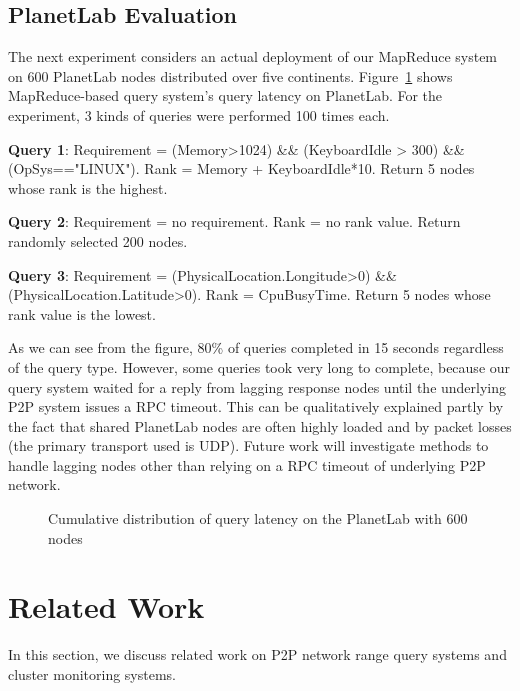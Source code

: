 \documentclass{acm_proc_article-sp}
\begin{document}
\subsection{PlanetLab Evaluation}
The next experiment considers an actual deployment of our MapReduce system on 600 PlanetLab nodes distributed over five continents. Figure~\ref{fig:plab} shows MapReduce-based query system's query latency on PlanetLab. 
For the experiment, 3 kinds of queries were performed 100 times each. 

\textbf{Query 1}: Requirement = (Memory>1024) \&\& (KeyboardIdle > 300) \&\& (OpSys=="LINUX"). Rank = Memory + KeyboardIdle*10. Return 5 nodes whose rank is the highest.

\textbf{Query 2}: Requirement = no requirement. Rank = no rank value. Return randomly selected 200 nodes. 

\textbf{Query 3}: Requirement = (PhysicalLocation.Longitude>0) \&\& (PhysicalLocation.Latitude>0). Rank = CpuBusyTime. Return 5 nodes whose rank value is the lowest.

As we can see from the figure, 80\% of queries completed in 15 seconds regardless of the query type. However, some queries took very long to complete, 
because our query system waited for a reply from lagging response nodes until the underlying P2P system issues a RPC timeout.
This can be qualitatively explained partly by the fact that shared PlanetLab nodes are often highly loaded and by packet losses (the primary transport used is UDP).
Future work will investigate methods to handle lagging nodes other than relying on a RPC timeout of underlying P2P network.
\begin{figure}
\centering
{}
\caption{\label{fig:plab}Cumulative distribution of query latency on the PlanetLab with 600 nodes}
\end{figure}
\section{Related Work}
In this section, we discuss related work on P2P network range query systems and cluster monitoring systems.
\end{document}
